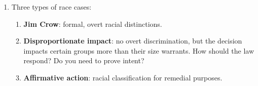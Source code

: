 % 
% 
% 
% 
% 

\begin{enumerate}
    \item Three types of race cases:
    \begin{enumerate}
        \item \textbf{Jim Crow}: formal, overt racial distinctions.
        \item \textbf{Disproportionate impact}: no overt discrimination, but 
        the decision impacts certain groups more than their size warrants. How 
        should the law respond? Do you need to prove intent?
        \item \textbf{Affirmative action}: racial classification for remedial 
        purposes.
    \end{enumerate}
\end{enumerate}

